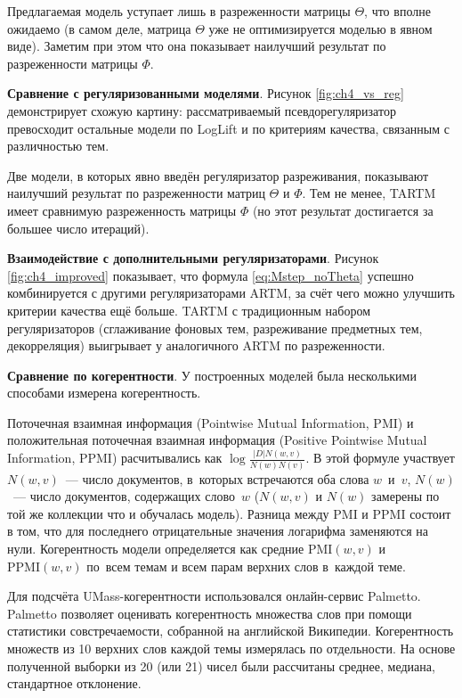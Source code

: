 Предлагаемая модель уступает лишь в разреженности матрицы $\Theta$, что вполне ожидаемо (в самом деле, матрица $\Theta$ уже не оптимизируется моделью в явном виде). Заметим при этом что она показывает наилучший результат по разреженности матрицы $\Phi$.

\textbf{Сравнение с регуляризованными моделями}. Рисунок \ref{fig:ch4_vs_reg} демонстрирует схожую картину: рассматриваемый псевдорегуляризатор превосходит остальные модели по LogLift и по критериям качества, связанным с различностью тем.

Две модели, в которых явно введён регуляризатор разреживания, показывают наилучший результат по разреженности матриц $\Theta$ и $\Phi$. Тем не менее, TARTM имеет сравнимую разреженность матрицы $\Phi$ (но этот результат достигается за большее число итераций). 

\textbf{Взаимодействие с дополнительными регуляризаторами}. Рисунок \ref{fig:ch4_improved} показывает, что формула \ref{eq:Mstep_noTheta} успешно комбинируется с другими регуляризаторами ARTM, за счёт чего можно улучшить критерии качества ещё больше. TARTM с традиционным набором регуляризаторов (сглаживание фоновых тем, разреживание предметных тем, декорреляция) выигрывает у аналогичного ARTM по разреженности.


\textbf{Сравнение по когерентности}. У построенных моделей была несколькими способами измерена когерентность. 

Поточечная взаимная информация (Pointwise Mutual Information, PMI) и положительная поточечная взаимная информация (Positive Pointwise Mutual Information, PPMI) расчитывались как $\log\frac{|D| N(w,v)}{N(w)N(v)}$. В этой формуле участвует $N(w,v)$~--- число документов, в~которых встречаются оба слова $w$~и~$v$,
$N(w)$~--- число документов, содержащих слово~$w$ ($N(w,v)$ и $N(w)$ замерены по той же коллекции что и обучалась модель). Разница между PMI и PPMI состоит в том, что для последнего отрицательные значения логарифма заменяются на нули. Когерентность модели определяется как средние $\mathrm{PMI}(w,v)$ и $\mathrm{PPMI}(w,v)$ по~всем темам и всем парам верхних слов в~каждой теме.

Для подсчёта UMass-когерентности использовался онлайн-сервис Palmetto. Palmetto позволяет оценивать когерентность множества слов при помощи статистики совстречаемости, собранной на английской Википедии. Когерентность множеств из 10 верхних слов каждой темы измерялась по отдельности. На основе полученной выборки из 20 (или 21) чисел были рассчитаны среднее, медиана, стандартное отклонение.

